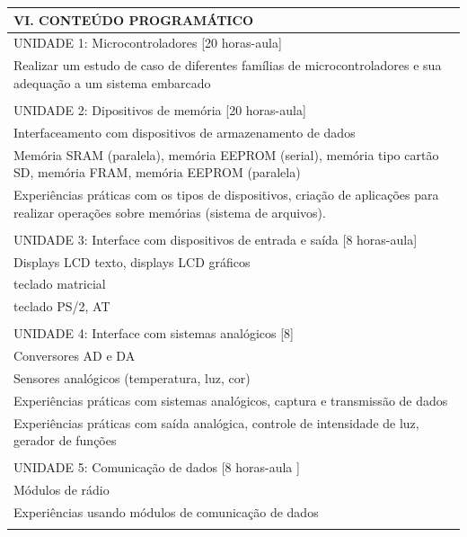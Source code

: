 \documentclass[12pt]{article}
\begin{document}
\begin{longtable}{|L{1.025\textwidth}|} \hline
%
{\bf VI. CONTEÚDO PROGRAMÁTICO } \\ \hline

UNIDADE 1: Microcontroladores [20 horas-aula]\\
  Realizar um estudo de caso de diferentes famílias de microcontroladores e sua adequação a um sistema embarcado\\
\\
UNIDADE 2: Dipositivos de memória [20 horas-aula]\\
Interfaceamento com dispositivos de armazenamento de dados\\
Memória SRAM (paralela), memória EEPROM (serial), memória tipo cartão SD, memória FRAM, memória EEPROM (paralela)\\
Experiências práticas com os tipos de dispositivos, criação de aplicações para realizar operações sobre memórias (sistema de arquivos). \\
\\
UNIDADE 3: Interface com dispositivos de entrada e saída [8 horas-aula]\\
Displays LCD texto, displays LCD gráficos\\
teclado matricial\\
teclado PS/2, AT\\
\\
UNIDADE 4: Interface com sistemas analógicos [8]\\
 Conversores AD e DA\\
 Sensores analógicos (temperatura, luz, cor)\\
 Experiências práticas com sistemas analógicos, captura e transmissão de dados\\
 Experiências práticas com saída analógica, controle de intensidade de luz, gerador de funções\\
\\
UNIDADE 5: Comunicação de dados [8 horas-aula ]\\
 Módulos de rádio\\
 Experiências usando módulos de comunicação de dados\\
\\ \hline
\end{longtable} 

\end{document}
